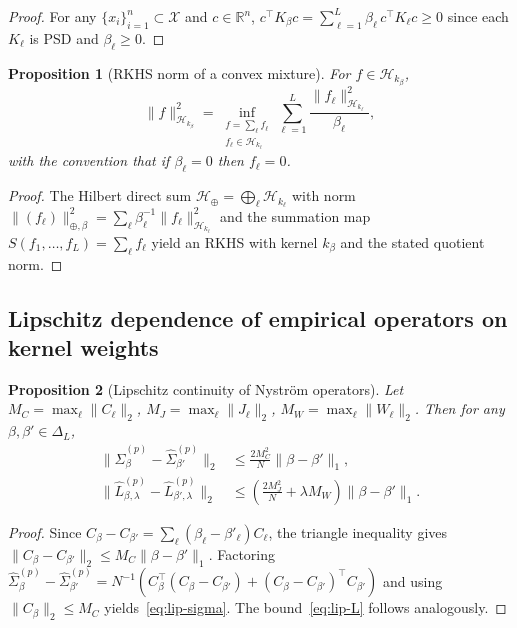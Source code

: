 \documentclass[11pt]{article}
\newtheorem{proposition}{Proposition}[section]
\theoremstyle{remark}
\newcommand{\Hk}{\mathcal{H}}
\begin{document}
\begin{proof}
For any $\{x_i\}_{i=1}^n\subset\mathcal{X}$ and $c\in\mathbb{R}^n$,
$c^\top K_\beta c = \sum_{\ell=1}^L \beta_\ell\, c^\top K_\ell c \ge 0$
since each $K_\ell$ is PSD and $\beta_\ell\ge 0$.
\end{proof}

\begin{proposition}[RKHS norm of a convex mixture]
\label{prop:rkhs-mixture-norm}
For $f\in \Hk_{k_\beta}$,
\[
\|f\|^2_{\Hk_{k_\beta}}
=
\inf_{\substack{f=\sum_{\ell} f_\ell\\ f_\ell\in\Hk_{k_\ell}}}
\sum_{\ell=1}^L \frac{\|f_\ell\|^2_{\Hk_{k_\ell}}}{\beta_\ell},
\]
with the convention that if $\beta_\ell=0$ then $f_\ell=0$.
\end{proposition}

\begin{proof}
The Hilbert direct sum $\mathcal{H}_\oplus=\bigoplus_\ell \Hk_{k_\ell}$ with norm $\|(f_\ell)\|^2_{\oplus,\beta}=\sum_\ell \beta_\ell^{-1}\|f_\ell\|^2_{\Hk_{k_\ell}}$ and the summation map $S(f_1,\dots,f_L)=\sum_\ell f_\ell$ yield an RKHS with kernel $k_\beta$ and the stated quotient norm.
\end{proof}

\subsection{Lipschitz dependence of empirical operators on kernel weights}
\label{subsec:theory-lipschitz}

\begin{proposition}[Lipschitz continuity of Nystr\"om operators]
\label{prop:lipschitz-operators}
Let $M_C=\max_\ell\|C_\ell\|_2$, $M_J=\max_\ell\|J_\ell\|_2$, $M_W=\max_\ell\|W_\ell\|_2$.
Then for any $\beta,\beta'\in\Delta_L$,
\begin{align}
\|\widehat{\Sigma}^{(p)}_\beta - \widehat{\Sigma}^{(p)}_{\beta'}\|_2 &\le \frac{2M_C^2}{N}\|\beta-\beta'\|_1, \label{eq:lip-sigma}\\
\|\widehat{L}^{(p)}_{\beta,\lambda} - \widehat{L}^{(p)}_{\beta',\lambda}\|_2 &\le \left(\frac{2M_J^2}{N}+\lambda M_W\right)\|\beta-\beta'\|_1. \label{eq:lip-L}
\end{align}
\end{proposition}

\begin{proof}
Since $C_\beta-C_{\beta'}=\sum_\ell(\beta_\ell-\beta'_\ell)C_\ell$, the triangle inequality gives $\|C_\beta-C_{\beta'}\|_2\le M_C\|\beta-\beta'\|_1$.
Factoring $\widehat{\Sigma}^{(p)}_\beta-\widehat{\Sigma}^{(p)}_{\beta'}=N^{-1}(C_\beta^\top(C_\beta-C_{\beta'})+(C_\beta-C_{\beta'})^\top C_{\beta'})$ and using $\|C_\beta\|_2\le M_C$ yields~\eqref{eq:lip-sigma}. The bound~\eqref{eq:lip-L} follows analogously.
\end{proof}
\end{document}
